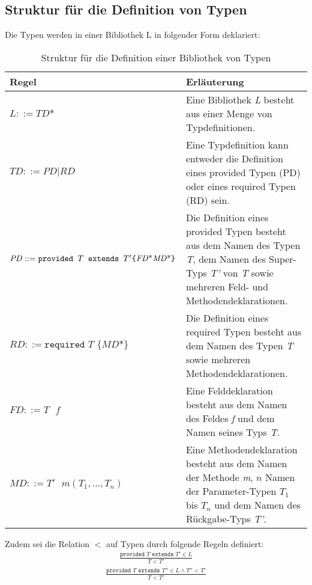 \subsection{Struktur für die Definition von Typen}\label{sec:strukturTypen}
Die Typen werden in einer Bibliothek $\text{L}$ in folgender Form deklariert:
\begin{table}[H]
\centering
\begin{tabular}{|p{5.5cm}|p{8.5cm}|}
\hline
\hline
\centering\textbf{Regel} & \textbf{Erläuterung} \\
\hline
\hline
$\mathit{L} ::= \mathit{TD}\text{*}$ & Eine Bibliothek \emph{L} besteht aus einer Menge von Typdefinitionen.\\
\hline
$\mathit{TD} ::= \mathit{PD} | \mathit{RD}$ & Eine Typdefinition kann entweder die Definition eines provided Typen (PD) oder eines required Typen (RD) sein.\\
\hline
$\mathit{PD} ::= \newline\texttt{provided }T \texttt{ extends } T' \newline  \texttt{\{} \mathit{FD}\text{*} \mathit{MD}\text{*}\texttt{\}}$& Die Definition eines provided Typen besteht aus dem Namen des Typen \emph{T}, dem Namen des Super-Typs \emph{T'} von \emph{T} sowie mehreren Feld- und Methodendeklarationen.\\
\hline
$\mathit{RD} ::= \texttt{required } T \texttt{ \{}\mathit{MD}\text{*}\texttt{\}}$ & Die Definition eines required Typen besteht aus dem Namen des Typen \emph{T} sowie mehreren Methodendeklarationen.\\
\hline
$\mathit{FD} ::= T \texttt{ }\mathit{f}$ & Eine Felddeklaration besteht aus dem Namen des Feldes \emph{f} und dem Namen seines Typs \emph{T}.\\
\hline
$\mathit{MD} ::= \mathit{T'}\texttt{ }\mathit{m(T_1,...,T_n)}$ & Eine Methodendeklaration besteht aus dem Namen der Methode \emph{m}, $n$ Namen der Parameter-Typen $T_1$ bis $T_n$ und dem Namen des Rückgabe-Typs \emph{T'}.\\
\hline
\hline
\end{tabular}
\caption{Struktur für die Definition einer Bibliothek von Typen}
 \label{tab_typeStruct}
\end{table}
\noindent
Zudem sei die Relation $<$ auf Typen durch folgende Regeln definiert:
\begin{gather*}
\frac{\texttt{provided }T \texttt{ extends } T' \in L}{T < T'}
\end{gather*}
\begin{gather*}
\frac{\texttt{provided } T \texttt{ extends } T'' \in L \wedge T'' < T'}{T < T'}
\end{gather*}
